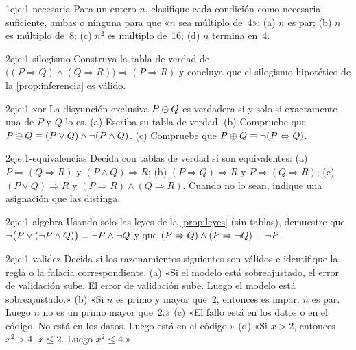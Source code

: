\begin{ejercicio}{1}{eje:1-necesaria}
Para un entero $n$, clasifique cada condición como necesaria, suficiente, ambas o ninguna para que «$n$ sea múltiplo de~4»: (a) $n$ es par; (b) $n$ es múltiplo de~8; (c) $n^{2}$ es múltiplo de~16; (d) $n$ termina en~4.
\end{ejercicio}

\begin{ejercicio}{2}{eje:1-silogismo}
Construya la tabla de verdad de $\bigl((P\Rightarrow Q)\wedge(Q\Rightarrow R)\bigr)\Rightarrow(P\Rightarrow R)$ y concluya que el silogismo hipotético de la \cref{prop:inferencia} es válido.
\end{ejercicio}

\begin{ejercicio}{2}{eje:1-xor}
La disyunción exclusiva $P\oplus Q$ es verdadera si y solo si exactamente una de $P$ y $Q$ lo es. (a) Escriba su tabla de verdad. (b) Compruebe que $P\oplus Q\equiv(P\vee Q)\wedge\neg(P\wedge Q)$. (c) Compruebe que $P\oplus Q\equiv\neg(P\Leftrightarrow Q)$.
\end{ejercicio}

\begin{ejercicio}{2}{eje:1-equivalencias}
Decida con tablas de verdad si son equivalentes: (a) $P\Rightarrow(Q\Rightarrow R)$ y $(P\wedge Q)\Rightarrow R$; (b) $(P\Rightarrow Q)\Rightarrow R$ y $P\Rightarrow(Q\Rightarrow R)$; (c) $(P\vee Q)\Rightarrow R$ y $(P\Rightarrow R)\wedge(Q\Rightarrow R)$. Cuando no lo sean, indique una asignación que las distinga.
\end{ejercicio}

\begin{ejercicio}{2}{eje:1-algebra}
Usando solo las leyes de la \cref{prop:leyes} (sin tablas), demuestre que $\neg\bigl(P\vee(\neg P\wedge Q)\bigr)\equiv\neg P\wedge\neg Q$ y que $(P\Rightarrow Q)\wedge(P\Rightarrow\neg Q)\equiv\neg P$.
\end{ejercicio}

\begin{ejercicio}{2}{eje:1-validez}
Decida si los razonamientos siguientes son válidos e identifique la regla o la falacia correspondiente. (a) «Si el modelo está sobreajustado, el error de validación sube. El error de validación sube. Luego el modelo está sobreajustado.» (b) «Si $n$ es primo y mayor que~2, entonces es impar. $n$ es par. Luego $n$ no es un primo mayor que~2.» (c) «El fallo está en los datos o en el código. No está en los datos. Luego está en el código.» (d) «Si $x>2$, entonces $x^{2}>4$. $x\le 2$. Luego $x^{2}\le 4$.»
\end{ejercicio}

